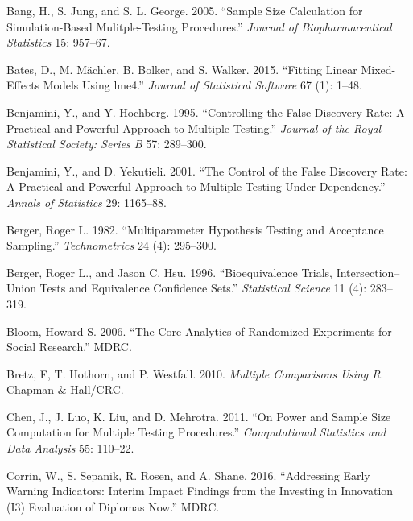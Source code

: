 \documentclass{article}
\newlength{\cslhangindent}
\newlength{\cslentryspacingunit} %
\newenvironment{CSLReferences}[2] %
 {%
  \setlength{\parindent}{0pt}
  \ifodd #1
  \let\oldpar\par
  \def\par{\hangindent=\cslhangindent\oldpar}
  \fi
  \setlength{\parskip}{#2\cslentryspacingunit}
 }%
 {}
\begin{document}
\hypertarget{refs}{}
\begin{CSLReferences}{1}{0}
\leavevmode{}%
Bang, H., S. Jung, and S. L. George. 2005. {``Sample Size Calculation
for Simulation-Based Mulitple-Testing Procedures.''} \emph{Journal of
Biopharmaceutical Statistics} 15: 957--67.

\leavevmode{}%
Bates, D., M. Mächler, B. Bolker, and S. Walker. 2015. {``Fitting Linear
Mixed-Effects Models Using {lme4}.''} \emph{Journal of Statistical
Software} 67 (1): 1--48.

\leavevmode{}%
Benjamini, Y., and Y. Hochberg. 1995. {``Controlling the False Discovery
Rate: A Practical and Powerful Approach to Multiple Testing.''}
\emph{Journal of the Royal Statistical Society: Series B} 57: 289--300.

\leavevmode{}%
Benjamini, Y., and D. Yekutieli. 2001. {``The Control of the False
Discovery Rate: A Practical and Powerful Approach to Multiple Testing
Under Dependency.''} \emph{Annals of Statistics} 29: 1165--88.

\leavevmode{}%
Berger, Roger L. 1982. {``Multiparameter Hypothesis Testing and
Acceptance Sampling.''} \emph{Technometrics} 24 (4): 295--300.

\leavevmode{}%
Berger, Roger L., and Jason C. Hsu. 1996. {``Bioequivalence Trials,
Intersection--Union Tests and Equivalence Confidence Sets.''}
\emph{Statistical Science} 11 (4): 283--319.

\leavevmode{}%
Bloom, Howard S. 2006. {``The Core Analytics of Randomized Experiments
for Social Research.''} MDRC.

\leavevmode{}%
Bretz, F, T. Hothorn, and P. Westfall. 2010. \emph{Multiple Comparisons
Using {R}}. Chapman \& Hall/CRC.

\leavevmode{}%
Chen, J., J. Luo, K. Liu, and D. Mehrotra. 2011. {``On Power and Sample
Size Computation for Multiple Testing Procedures.''} \emph{Computational
Statistics and Data Analysis} 55: 110--22.

\leavevmode{}%
Corrin, W., S. Sepanik, R. Rosen, and A. Shane. 2016. {``Addressing
Early Warning Indicators: Interim Impact Findings from the Investing in
Innovation (I3) Evaluation of Diplomas Now.''} MDRC.


\end{CSLReferences}
\end{document}
